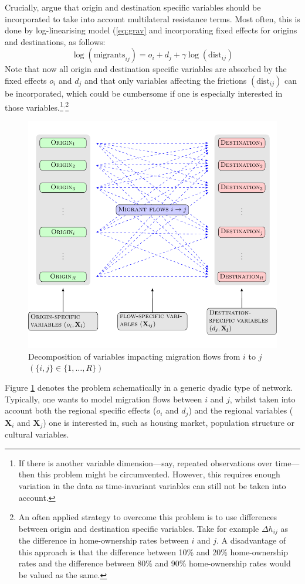 \documentclass[a4paper,fleqn]{cas-dc}
\begin{document}
Crucially, \citet{anderson2003gravity} argue that origin and destination
specific variables should be incorporated to take into account multilateral
resistance terms. Most often, this is done by log-linearising model
(\ref{eq:grav} and incorporating fixed effects for origins and destinations, as
follows:
\begin{equation}
  \log(\text{migrants}_{ij}) = o_i + d_j +  \gamma\log(\text{dist}_{ij})
  \label{eq:gravfixed}
\end{equation}
Note that now all origin and destination specific variables are absorbed by the
fixed effects $o_i$ and $d_j$ and that only variables affecting the frictions
$(\text{dist}_{ij})$ can be incorporated, which could be cumbersome if one is
especially interested in those variables.\footnote{If there is another variable
  dimension---say, repeated observations over time---then this problem might be
  circumvented. However, this requires enough variation in the data as
  time-invariant variables can still not be taken into account.}$^{,}$\footnote{An
  often applied strategy to overcome this problem is to use differences between
  origin and destination specific variables. Take for example $\Delta h_{ij}$ as
  the difference in home-ownership rates between $i$ and $j$. A disadvantage of
  this approach is that the difference between 10\% and 20\% home-ownership
  rates and the difference between 80\% and 90\% home-ownership rates would be
  valued as the same.}
\begin{figure}[ht]\centering
  \includegraphics[width=\linewidth]{./../../fig/gravity_network.pdf}
  \caption{Decomposition of variables impacting migration flows from $i$ to $j$
    $\left(\{i,j\} \in \{1,\ldots, R\}\right)$}
  \label{fig:gravity_network}
\end{figure}
Figure \ref{fig:gravity_network} denotes the problem schematically in a generic
dyadic type of network. Typically, one wants to model migration flows between
$i$ and $j$, whilst taken into account both the regional specific effects
($o_i$ and $d_j$) and the regional variables ($\mathbf{X}_i$ and
$\mathbf{X}_j$) one is interested in, such as housing market, population
structure or cultural variables.
\end{document}
